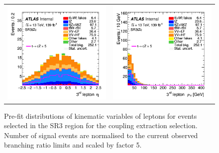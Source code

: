 \begin{figure}[!htbp]
\begin{tabular}{cc}
		\includegraphics[width=.45\textwidth]{Chapters/CH5/figures/SR3_UsingSMT/lep3_eta} &
		\includegraphics[width=.45\textwidth]{Chapters/CH5/figures/SR3_UsingSMT/lep3_pt} \\
	\end{tabular}
	\caption{Pre-fit distributions of kinematic variables of leptons for events selected in the SR3 region for the \tZc coupling extraction selection.  Number of signal events are normalised to the current observed branching ratio limits and scaled by factor 5. 
		\ErrStatOnly
		\Blinded
	}%
	\label{fig:sr3_kin_lep}
\end{figure}

